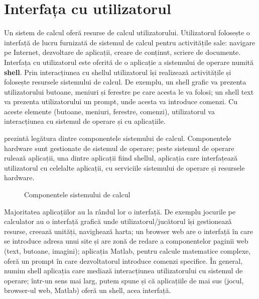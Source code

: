 \chapter{Interfața cu utilizatorul}
\label{chapter:ui}

Un sistem de calcul oferă resurse de calcul utilizatorului. Utilizatorul folosește o interfață de lucru furnizată de sistemul de calcul pentru activitățile sale: navigare pe Internet, dezvoltare de aplicații, creare de conținut, scriere de documente. Interfața cu utilizatorul este oferită de o aplicație a sistemului de operare numită \textbf{shell}. Prin interacțiunea cu shellul utilizatorul își realizează activitățile și folosește resursele sistemului de calcul. De exemplu, un shell grafic va prezenta utilizatorului butoane, meniuri și ferestre pe care acesta le va folosi; un shell text va prezenta utilizatorului un prompt, unde acesta va introduce comenzi. Cu aceste elemente (butoane, meniuri, ferestre, comenzi), utilizatorul va interacțiunea cu sistemul de operare și cu aplicațiile.

 prezintă legătura dintre componentele sistemului de calcul. Componentele hardware sunt gestionate de sistemul de operare; peste sistemul de operare rulează aplicații, una dintre aplicații fiind shellul, aplicația care interfațează utilizatorul cu celelalte aplicații, cu serviciile sistemului de operare și resursele hardware.

\begin{figure}[htbp]
  \centering
  \def\svgwidth{\columnwidth}
  
  \caption{Componentele sistemului de calcul}
  \label{fig:ui:system-components}
\end{figure}

Majoritatea aplicațiilor au la rândul lor o interfață. De exemplu jocurile pe calculator au o interfață grafică unde utilizatorul/jucătorul își gestionează resurse, creează unități, navighează harta; un browser web are o interfață în care se introduce adresa unui site și are zonă de redare a componentelor paginii web (text, butoane, imagini); aplicația Matlab, pentru calcule matematice complexe, oferă un prompt în care dezvoltatorul introduce comenzi specifice. În general, numim shell aplicația care mediază interacțiunea utilizatorului cu sistemul de operare; într-un sens mai larg, putem spune și că aplicațiile de mai sus (jocul, browser-ul web, Matlab) oferă un shell, acea interfață.

